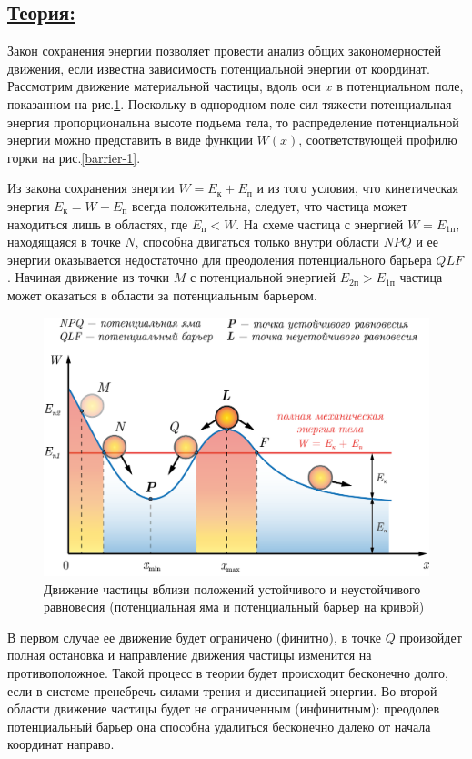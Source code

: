\documentclass[14pt,a4paper,oneside]{extarticle}	%
\begin{document}
\newpage
\subsection*{\underline{Теория:}}
	
Закон сохранения энергии позволяет провести анализ общих закономерностей движения, если известна зависимость потенциальной энергии от координат. 
Рассмотрим движение материальной частицы, вдоль оси $ x $ в потенциальном поле, показанном на рис.\ref{barrier-2}.
Поскольку в однородном поле сил тяжести потенциальная энергия пропорциональна высоте подъема тела, то распределение потенциальной энергии можно представить в виде функции $ W(x) $, соответствующей профилю горки на рис.\ref{barrier-1}.
		
Из закона сохранения энергии $  W = E_{\text{к}} + E_{\text{п}}  $ и из того условия, что кинетическая энергия $ E_{\text{к}} = W - E_{\text{п}} $ всегда положительна, следует, что частица может находиться лишь в областях, где $ E_{\text{п}} < W $.
На схеме частица с энергией $ W = E_{1\text{п}} $, находящаяся в точке $ N $, способна двигаться только внутри области $ NPQ $ и ее энергии оказывается недостаточно для преодоления потенциального барьера $ QLF $.
Начиная движение из точки $ M $ с потенциальной энергией $ E_{2\text{п}} > E_{1\text{п}} $ частица может оказаться в области за потенциальным барьером.
\begin{figure}[H] 	
	\centering 	
	\includegraphics[width=0.95\linewidth]{barrier-2.png}
	\caption{Движение частицы вблизи положений устойчивого и неустойчивого равновесия (потенциальная яма и потенциальный барьер на кривой)}
	\label{barrier-2}
\end{figure}

В первом случае ее движение будет ограничено (финитно), в точке $ Q $ произойдет полная остановка и направление движения частицы изменится на противоположное.
Такой процесс в теории будет происходит бесконечно долго, если в системе пренебречь силами трения и диссипацией энергии.
Во второй области движение частицы будет не ограниченным (инфинитным): преодолев потенциальный барьер она способна удалиться бесконечно далеко от начала координат направо.
\end{document}
